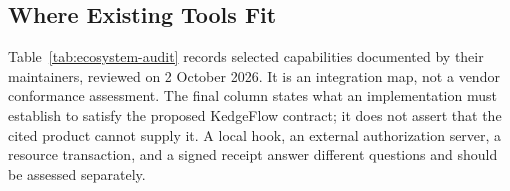 


\subsection{Where Existing Tools Fit}
\label{sec:ecosystem-mapping}

Table~\ref{tab:ecosystem-audit} records selected capabilities documented by their maintainers, reviewed on 2 October 2026. It is an integration map, not a vendor conformance assessment. The final column states what an implementation must establish to satisfy the proposed KedgeFlow contract; it does not assert that the cited product cannot supply it. A local hook, an external authorization server, a resource transaction, and a signed receipt answer different questions and should be assessed separately.

